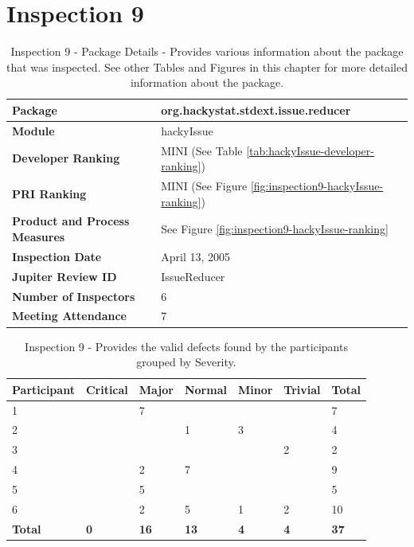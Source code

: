 \clearpage
\section{Inspection 9}
\label{appendix:section:inspection9}


\begin{table}[!h]
  \begin{center}
    \caption[Inspection 9 - Package Details]{Inspection 9 - Package Details 
      - Provides various information about the package that was
      inspected. See other Tables and Figures in this chapter for more
      detailed information about the package.}
    \label{tab:inspection-package-details-8}
    \begin{tabular}{|p{5.0cm}|p{8.0cm}|} \hline
{\bf Package} & org.hackystat.stdext.issue.reducer \\ \hline
{\bf Module} & hackyIssue \\ \hline
{\bf Developer Ranking} & MINI (See Table \ref{tab:hackyIssue-developer-ranking}) \\ \hline
{\bf PRI Ranking} & MINI (See Figure \ref{fig:inspection9-hackyIssue-ranking}) \\ \hline
{\bf Product and Process Measures} & See Figure \ref{fig:inspection9-hackyIssue-ranking} \\ \hline
{\bf Inspection Date} & April 13, 2005 \\ \hline
{\bf Jupiter Review ID} & IssueReducer \\ \hline
{\bf Number of Inspectors} & 6 \\ \hline
{\bf Meeting Attendance} & 7 \\ \hline
    \end{tabular}
  \end{center}
\end{table}

\begin{table}[!h]
  \begin{center}
    \caption[Inspection 9 - Results by Severity]{Inspection 9
      - Provides the valid defects found by the participants grouped by
      Severity.}
    \label{tab:inspection-results-9}
    \begin{tabular}{|p{2.0cm}|p{1.5cm}|p{1.5cm}|p{1.5cm}|p{1.5cm}|p{1.5cm}|p{1.5cm}|} \hline
{\bf Participant} & {\bf Critical} & {\bf Major} 
& {\bf Normal} & {\bf Minor} & {\bf Trivial} & {\bf Total} \\ \hline
1 &   & 7 &   &   &   & 7 \\ \hline
2 &   &   & 1 & 3 &   & 4 \\ \hline
3 &   &   &   &   & 2 & 2 \\ \hline
4 &   & 2 & 7 &   &   & 9 \\ \hline
5 &   & 5 &   &   &   & 5 \\ \hline
6 &   & 2 & 5 & 1 & 2 & 10 \\ \hline
{\bf Total} & {\bf 0} & {\bf 16} & {\bf 13} & {\bf 4} & {\bf 4} & {\bf 37} \\ \hline
    \end{tabular}
  \end{center}
\end{table}


